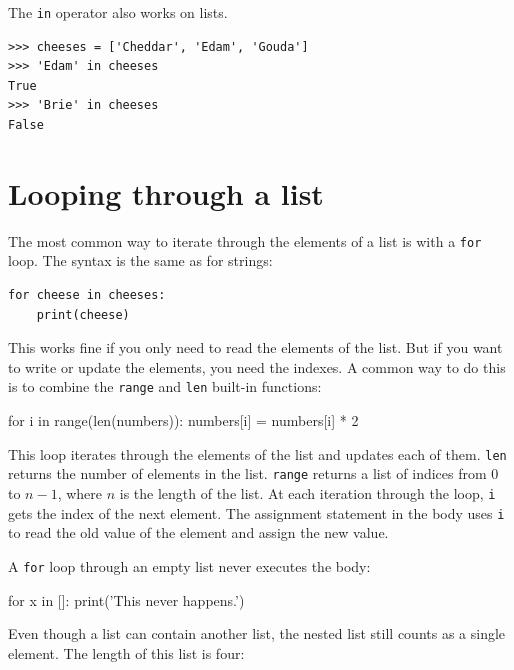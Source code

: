 
The \texttt{in} operator also works on lists.

\begin{Verbatim}[frame=single]
>>> cheeses = ['Cheddar', 'Edam', 'Gouda']
>>> 'Edam' in cheeses
True
>>> 'Brie' in cheeses
False
\end{Verbatim}


\section{Looping through a list}

The most common way to iterate through the elements of a list is with a \texttt{for} loop. The syntax is the same as for strings:

\begin{Verbatim}[frame=single]
for cheese in cheeses:
    print(cheese)
\end{Verbatim}
%
This works fine if you only need to read the elements of the list. But if you want to write or update the elements, you need the indexes. A common way to do this is to combine the \texttt{range} and \texttt{len} built-in functions:

\begin{python}[frame=single]
for i in range(len(numbers)):
    numbers[i] = numbers[i] * 2
\end{python}
%
This loop iterates through the elements of the list and updates each of them. \texttt{len} returns the number of elements in the list. \texttt{range} returns a list of indices from 0 to $n-1$, where $n$ is the length of the list. At each iteration through the loop, \texttt{i} gets the index of the next element. The assignment statement in the body uses \texttt{i} to read the old value of the element and assign the new value.

A \texttt{for} loop through an empty list never executes the body:

\begin{python}[frame=single]
for x in []:
    print('This never happens.')
\end{python}
%
Even though a list can contain another list, the nested list still counts as a single element. The length of this list is four:

